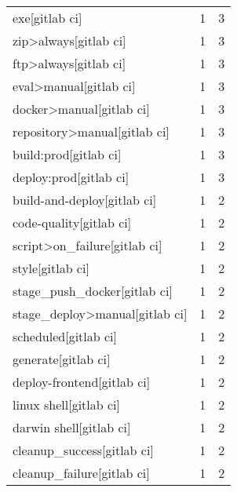 \begin{tabular}{lrr}
exe[gitlab ci]                             &                   1 &             3 \\
zip>always[gitlab ci]                      &                   1 &             3 \\
ftp>always[gitlab ci]                      &                   1 &             3 \\
eval>manual[gitlab ci]                     &                   1 &             3 \\
docker>manual[gitlab ci]                   &                   1 &             3 \\
repository>manual[gitlab ci]               &                   1 &             3 \\
build:prod[gitlab ci]                      &                   1 &             3 \\
deploy:prod[gitlab ci]                     &                   1 &             3 \\
build-and-deploy[gitlab ci]                &                   1 &             2 \\
code-quality[gitlab ci]                    &                   1 &             2 \\
script>on\_failure[gitlab ci]               &                   1 &             2 \\
style[gitlab ci]                           &                   1 &             2 \\
stage\_push\_docker[gitlab ci]               &                   1 &             2 \\
stage\_deploy>manual[gitlab ci]             &                   1 &             2 \\
scheduled[gitlab ci]                       &                   1 &             2 \\
generate[gitlab ci]                        &                   1 &             2 \\
deploy-frontend[gitlab ci]                 &                   1 &             2 \\
linux shell[gitlab ci]                     &                   1 &             2 \\
darwin shell[gitlab ci]                    &                   1 &             2 \\
cleanup\_success[gitlab ci]                 &                   1 &             2 \\
cleanup\_failure[gitlab ci]                 &                   1 &             2 \\

\end{tabular}
